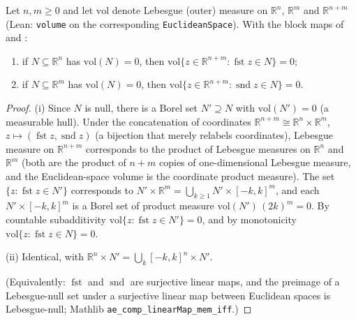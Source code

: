 \begin{lemma}
Let $n,m\ge0$ and let $\mathrm{vol}$ denote Lebesgue (outer) measure on $\mathbb R^n$, $\mathbb R^m$ and $\mathbb R^{n+m}$ (Lean: \texttt{volume} on the corresponding \texttt{EuclideanSpace}). With the block maps of  and :
\begin{enumerate}
\item[(i)] if $N\subseteq\mathbb R^n$ has $\mathrm{vol}(N)=0$, then $\mathrm{vol}\{z\in\mathbb R^{n+m}:\operatorname{fst}z\in N\}=0$;
\item[(ii)] if $N\subseteq\mathbb R^m$ has $\mathrm{vol}(N)=0$, then $\mathrm{vol}\{z\in\mathbb R^{n+m}:\operatorname{snd}z\in N\}=0$.
\end{enumerate}
\end{lemma}
\begin{proof}
(i) Since $N$ is null, there is a Borel set $N'\supseteq N$ with $\mathrm{vol}(N')=0$ (a measurable hull). Under the concatenation of coordinates $\mathbb R^{n+m}\cong\mathbb R^n\times\mathbb R^m$, $z\mapsto(\operatorname{fst}z,\operatorname{snd}z)$ (a bijection that merely relabels coordinates), Lebesgue measure on $\mathbb R^{n+m}$ corresponds to the product of Lebesgue measures on $\mathbb R^n$ and $\mathbb R^m$ (both are the product of $n+m$ copies of one-dimensional Lebesgue measure, and the Euclidean-space volume is the coordinate product measure). The set $\{z:\operatorname{fst}z\in N'\}$ corresponds to $N'\times\mathbb R^m=\bigcup_{k\ge1}N'\times[-k,k]^m$, and each $N'\times[-k,k]^m$ is a Borel set of product measure $\mathrm{vol}(N')\,(2k)^m=0$. By countable subadditivity $\mathrm{vol}\{z:\operatorname{fst}z\in N'\}=0$, and by monotonicity $\mathrm{vol}\{z:\operatorname{fst}z\in N\}=0$.

(ii) Identical, with $\mathbb R^n\times N'=\bigcup_k[-k,k]^n\times N'$.

(Equivalently: $\operatorname{fst}$ and $\operatorname{snd}$ are surjective linear maps, and the preimage of a Lebesgue-null set under a surjective linear map between Euclidean spaces is Lebesgue-null; Mathlib \texttt{ae\_comp\_linearMap\_mem\_iff}.)
\end{proof}
